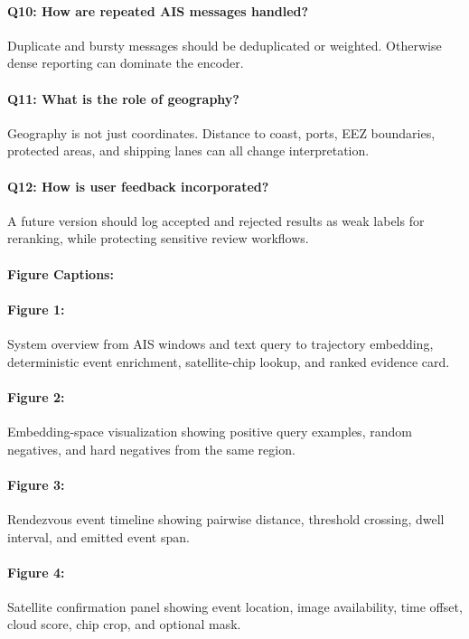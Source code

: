 \documentclass{article}
\begin{document}
\paragraph{Q10: How are repeated AIS messages handled?}
Duplicate and bursty messages should be deduplicated or weighted. Otherwise dense reporting can dominate the encoder.

\paragraph{Q11: What is the role of geography?}
Geography is not just coordinates. Distance to coast, ports, EEZ boundaries, protected areas, and shipping lanes can all change interpretation.

\paragraph{Q12: How is user feedback incorporated?}
A future version should log accepted and rejected results as weak labels for reranking, while protecting sensitive review workflows.

\paragraph{Figure Captions:}

\paragraph{Figure 1:}
System overview from AIS windows and text query to trajectory embedding, deterministic event enrichment, satellite-chip lookup, and ranked evidence card.

\paragraph{Figure 2:}
Embedding-space visualization showing positive query examples, random negatives, and hard negatives from the same region.

\paragraph{Figure 3:}
Rendezvous event timeline showing pairwise distance, threshold crossing, dwell interval, and emitted event span.

\paragraph{Figure 4:}
Satellite confirmation panel showing event location, image availability, time offset, cloud score, chip crop, and optional mask.
\end{document}
